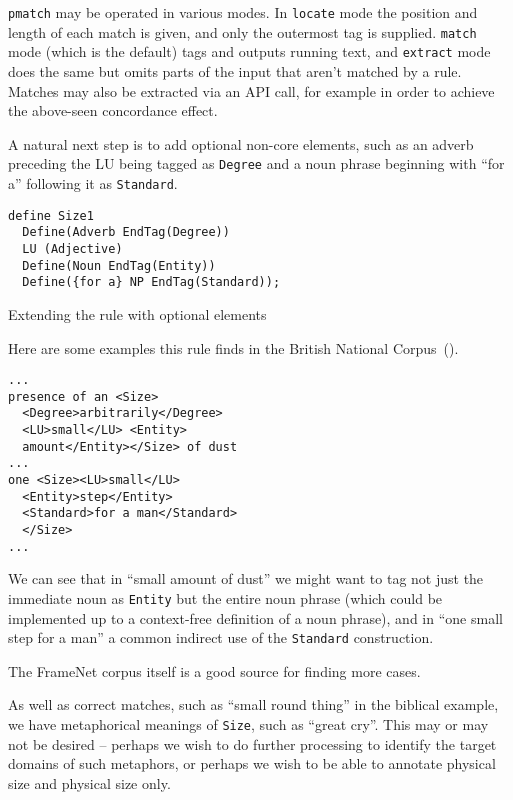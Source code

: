 \documentclass[11pt]{article}
\begin{document}
\verb+pmatch+ may be operated in various modes. In \verb+locate+ mode the
position and length of each match is given, and only the outermost tag is
supplied. \verb+match+ mode (which is the default) tags and outputs running
text, and \verb+extract+ mode does the same but omits parts of the input that
aren't matched by a rule. Matches may also be extracted via an API call, for
example in order to achieve the above-seen concordance effect.

A natural next step is to add optional non-core elements, such as an adverb
preceding the LU being tagged as \verb+Degree+ and a noun phrase beginning with
``for a'' following it as \verb+Standard+.

\begin{table}[h]
  \small
  \begin{framed}
\begin{verbatim}
define Size1
  Define(Adverb EndTag(Degree))
  LU (Adjective)
  Define(Noun EndTag(Entity))
  Define({for a} NP EndTag(Standard));
\end{verbatim}
\end{framed}
\normalsize
\caption{Extending the rule with optional elements}
\end{table}

Here are some examples this rule finds in the British National
Corpus~().

  \small
  \begin{framed}
\begin{verbatim}
...
presence of an <Size>
  <Degree>arbitrarily</Degree>
  <LU>small</LU> <Entity>
  amount</Entity></Size> of dust
...
one <Size><LU>small</LU>
  <Entity>step</Entity>
  <Standard>for a man</Standard>
  </Size>
...
\end{verbatim}
  \end{framed}
  \normalsize

We can see that in ``small amount of dust'' we might want to
tag not just the immediate noun as \verb+Entity+ but the entire noun phrase
(which could be implemented up to a context-free definition of a noun phrase),
and in ``one small step for a man'' a common indirect use of the \verb+Standard+
construction.

The FrameNet corpus itself is a
good source for finding more cases.

As well as correct matches, such as ``small round thing'' in the biblical
example, we have metaphorical meanings of \verb+Size+, such as ``great cry''.
This may or may not be desired -- perhaps we wish to do further processing to
identify the target domains of such metaphors, or perhaps we wish to be able
to annotate physical size and physical size only.
\end{document}
